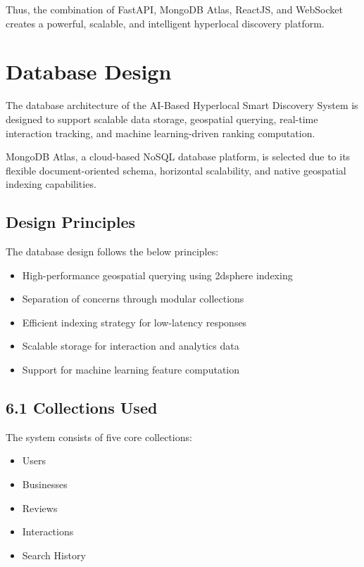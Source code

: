 \documentclass[12pt,a4paper]{report}
\begin{document}
Thus, the combination of FastAPI, MongoDB Atlas, ReactJS, and WebSocket creates a powerful, scalable, and intelligent hyperlocal discovery platform.


\chapter{Database Design}

The database architecture of the AI-Based Hyperlocal Smart Discovery System is designed to support scalable data storage, geospatial querying, real-time interaction tracking, and machine learning-driven ranking computation. 

MongoDB Atlas, a cloud-based NoSQL database platform, is selected due to its flexible document-oriented schema, horizontal scalability, and native geospatial indexing capabilities.

\section{Design Principles}

The database design follows the below principles:

\begin{itemize}

\item High-performance geospatial querying using 2dsphere indexing

\item Separation of concerns through modular collections

\item Efficient indexing strategy for low-latency responses

\item Scalable storage for interaction and analytics data

\item Support for machine learning feature computation

\end{itemize}

\section{6.1 Collections Used}

The system consists of five core collections:

\begin{itemize}

\item Users

\item Businesses

\item Reviews

\item Interactions

\item Search History

\end{itemize}
\end{document}
